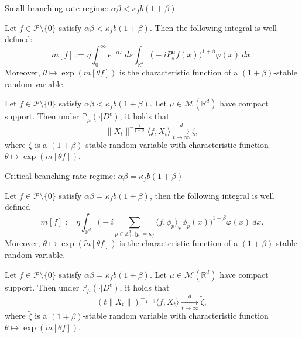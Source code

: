 \documentclass[9pt]{beamer}
\begin{document}
\begin{frame}{Small branching rate regime: $\alpha\beta < \kappa_f b (1+\beta)$}
\begin{lemma}
	Let $f\in \mathcal{P}\setminus\{0\}$ satisfy $\alpha\beta<\kappa_f b(1+\beta)$.
	Then the following integral is well defined:
\begin{equation}
    m[f]
    :=\eta \int_0^{\infty} e^{-\alpha s} ~ds\int_{\mathbb R^d} \big(-iP_s^\alpha f(x)\big)^{1+\beta} \varphi(x)~dx.
\end{equation}
	Moreover, $\theta \mapsto \exp( m[\theta f])$ is the characteristic function of a $(1+\beta)$-stable random variable.
\end{lemma}
\begin{theorem}
    Let $f\in \mathcal{P}\setminus\{0\}$ satisfy $\alpha\beta<\kappa_f b(1+\beta)$.
    Let $\mu\in \mathcal M(\mathbb R^d)$ have compact support. Then under $\mathbb{P}_{\mu}(\cdot|D^c)$, it holds that
\[
    \|X_t\|^{-\frac{1}{1+\beta}} \langle f,X_t\rangle\xrightarrow[t\rightarrow \infty]{d} \zeta,
\]
    where $\zeta$ is a $(1+\beta)$-stable random variable with characteristic function $\theta \mapsto \exp( m[\theta f])$.
\end{theorem}
\end{frame}
\begin{frame}{Critical branching rate regime: $\alpha\beta = \kappa_f b (1+\beta)$}
\begin{lemma}
	Let $f\in \mathcal{P}\setminus\{0\}$ satisfy $\alpha\beta=\kappa_f b(1+\beta)$, then the following integral is well defined
\[
	\widetilde{m}[f]
    := \eta\int_{\mathbb R^d} \Big(-i\sum_{p\in \mathbb Z_+^d:|p|=\kappa_f}\langle f,\phi_p\rangle_\varphi \phi_p(x)\Big)^{1+\beta} \varphi(x)~dx.
\]
	Moreover, $\theta \mapsto \exp( \widetilde m[\theta f])$ is the characteristic function of a $(1+\beta)$-stable random variable.
\end{lemma}
\begin{theorem}
\label{thm: critical clt}
    Let $f\in \mathcal{P}\setminus\{0\}$ satisfy $\alpha\beta=\kappa_f b(1+\beta)$.
    Let $\mu\in \mathcal M(\mathbb R^d)$ have compact support. Then under $\mathbb{P}_{\mu}(\cdot|D^c)$, it holds that
\[
    (t\|X_t\|)^{-\frac{1}{1+\beta}} \langle f,X_t\rangle
        \xrightarrow[t\to \infty]{d} \widetilde{\zeta},
\]
    where $\widetilde{\zeta}$ is a $(1+\beta)$-stable random variable with
    characteristic function $\theta \mapsto \exp( \widetilde m[\theta f])$.
\end{theorem}
\end{frame}
\end{document}
